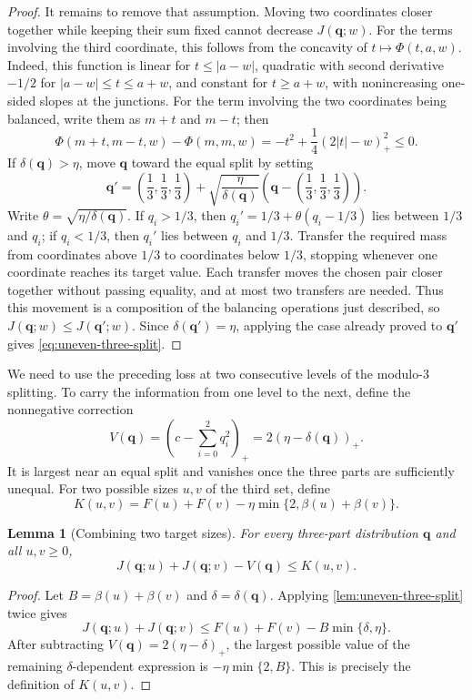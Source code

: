 \documentclass[11pt]{article}
\numberwithin{equation}{section}
\newtheorem{lemma}[lemma]{Lemma}
\theoremstyle{remark}
\newcommand{\pos}[1]{(#1)_{+}}
\begin{document}
\begin{proof}
It remains to remove that assumption.  Moving two coordinates closer
together while keeping their sum fixed cannot decrease $J(\mathbf q;w)$.  For the
terms involving the third coordinate, this follows from the concavity of
$t\mapsto\Phi(t,a,w)$.  Indeed, this function is linear for
$t\le |a-w|$, quadratic with second derivative $-1/2$ for
$|a-w|\le t\le a+w$, and constant for $t\ge a+w$, with nonincreasing
one-sided slopes at the junctions.  For the term involving the two
coordinates being balanced, write them as $m+t$ and $m-t$; then
\[
 \Phi(m+t,m-t,w)-\Phi(m,m,w)
 =-t^2+\frac14(2|t|-w)_+^2\le0.
\]
If $\delta(\mathbf q)>\eta$, move $\mathbf q$ toward the equal split by setting
\[
 \mathbf q'=\left(\frac13,\frac13,\frac13\right)
 +\sqrt{\frac{\eta}{\delta(\mathbf q)}}
 \left(\mathbf q-\left(\frac13,\frac13,\frac13\right)\right).
\]
Write $\theta=\sqrt{\eta/\delta(\mathbf q)}$.  If $q_i>1/3$, then
$q_i'=1/3+\theta(q_i-1/3)$ lies between $1/3$ and $q_i$; if $q_i<1/3$,
then $q_i'$ lies between $q_i$ and $1/3$.  Transfer the required mass from
coordinates above $1/3$ to coordinates below $1/3$, stopping whenever one
coordinate reaches its target value.  Each transfer moves the chosen pair
closer together without passing equality, and at most two transfers are
needed.  Thus this movement is a composition of the balancing operations
just described, so $J(\mathbf q;w)\le J(\mathbf q';w)$.  Since $\delta(\mathbf q')=\eta$, applying
the case already proved to $\mathbf q'$ gives \eqref{eq:uneven-three-split}.
\end{proof}

We need to use the preceding loss at two consecutive levels of the
modulo-$3$ splitting.  To carry the information from one level to the next, define the nonnegative
correction
\begin{equation}\label{eq:def-V}
 V(\mathbf q)=\left(c-\sum_{i=0}^2q_i^2\right)_{+}
 =2\pos{\eta-\delta(\mathbf q)}.
\end{equation}
It is largest near an equal split and vanishes once the three parts are
sufficiently unequal.  For two possible sizes $u,v$ of the third set,
define
\begin{equation}\label{eq:def-K}
 K(u,v)=F(u)+F(v)-\eta\min\{2,\beta(u)+\beta(v)\}.
\end{equation}
\begin{lemma}[Combining two target sizes]\label{lem:two-target-sizes}
For every three-part distribution $\mathbf q$ and all $u,v\ge0$,
\begin{equation}\label{eq:two-target-sizes}
 J(\mathbf q;u)+J(\mathbf q;v)-V(\mathbf q)\le K(u,v).
\end{equation}
\end{lemma}
\begin{proof}
Let $B=\beta(u)+\beta(v)$ and $\delta=\delta(\mathbf q)$.  Applying
\cref{lem:uneven-three-split} twice gives
\[
 J(\mathbf q;u)+J(\mathbf q;v)
 \le F(u)+F(v)-B\min\{\delta,\eta\}.
\]
After subtracting $V(\mathbf q)=2(\eta-\delta)_+$, the largest possible value of
the remaining $\delta$-dependent expression is
$-\eta\min\{2,B\}$.  This is precisely the definition of $K(u,v)$.
\end{proof}
\end{document}
